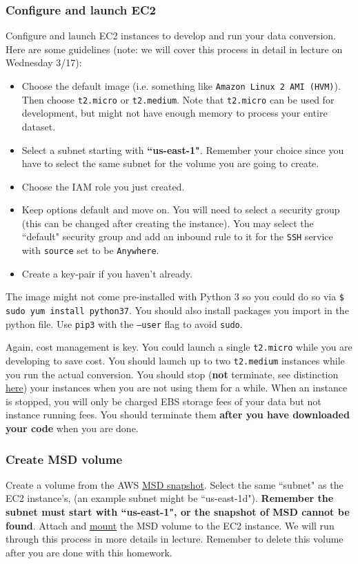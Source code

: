 \subsubsection{Configure and launch EC2}
Configure and launch EC2 instances to develop and run your data conversion. Here are some guidelines (note: we will cover this process in detail in lecture on Wednesday 3/17):
\begin{itemize}
    \item Choose the default image (i.e. something like \texttt{Amazon Linux 2 AMI (HVM)}). Then choose \texttt{t2.micro} or \texttt{t2.medium}. Note that \texttt{t2.micro} can be used for development, but might not have enough memory to process your entire dataset.
    \item Select a subnet starting with \textbf{``us-east-1"}. Remember your choice since you have to select the same subnet for the volume you are going to create.
    \item Choose the IAM role you just created.
    \item Keep options default and move on. You will need to select a security group (this can be changed after creating the instance). You may select the ``default" security group and add an inbound rule to it for the \texttt{SSH} service with \texttt{source} set to be \texttt{Anywhere}.
    \item Create a key-pair if you haven't already.
\end{itemize}

The image might not come pre-installed with Python 3 so you could do so via \texttt{\$ sudo yum install python37}. You should also install packages you import in the python file. Use \texttt{pip3} with the \texttt{--user} flag to avoid \texttt{sudo}.

Again, cost management is key. You could launch a single \texttt{t2.micro} while you are developing to save cost. You should launch up to two \texttt{t2.medium} instances while you run the actual conversion. You should stop (\textbf{not} terminate, see distinction \href{https://docs.aws.amazon.com/AWSEC2/latest/UserGuide/ec2-instance-lifecycle.html}{here}) your instances when you are not using them for a while. When an instance is stopped, you will only be charged EBS storage fees of your data but not instance running fees. You should terminate them \textbf{after you have downloaded your code} when you are done.

\subsubsection{Create MSD volume}
Create a volume from the AWS \href{https://aws.amazon.com/datasets/million-song-dataset/}{MSD snapshot}. Select the same ``subnet" as the EC2 instance's, (an example subnet might be ``us-east-1d"). \textbf{Remember the subnet must start with ``us-east-1", or the snapshot of MSD cannot be found}. Attach and \href{https://docs.aws.amazon.com/AWSEC2/latest/UserGuide/ebs-using-volumes.html}{mount} the MSD volume to the EC2 instance. We will run through this process in more details in lecture. Remember to delete this volume after you are done with this homework.

